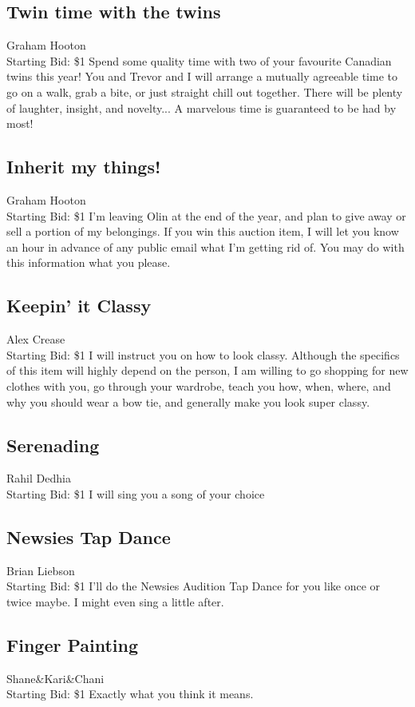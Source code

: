 \documentclass[11pt]{article}
\begin{document}
\subsection{Twin time with the twins}
Graham Hooton
\\
Starting Bid: \$1
\newline
Spend some quality time with two of your favourite Canadian twins this year! You and Trevor and I will arrange a mutually agreeable time to go on a walk, grab a bite, or just straight chill out together. There will be plenty of laughter, insight, and novelty... A marvelous time is guaranteed to be had by most!
\subsection{Inherit my things!}
Graham Hooton
\\
Starting Bid: \$1
\newline
I'm leaving Olin at the end of the year, and plan to give away or sell a portion of my belongings. If you win this auction item, I will let you know an hour in advance of any public email what I'm getting rid of. You may do with this information what you please.
\subsection{Keepin' it Classy}
Alex Crease
\\
Starting Bid: \$1
\newline
I will instruct you on how to look classy. Although the specifics of this item will highly depend on the person, I am willing to go shopping for new clothes with you, go through your wardrobe, teach you how, when, where, and why you should wear a bow tie, and generally make you look super classy.
\subsection{Serenading}
Rahil Dedhia
\\
Starting Bid: \$1
\newline
I will sing you a song of your choice
\subsection{Newsies Tap Dance}
Brian Liebson
\\
Starting Bid: \$1
\newline
I'll do the Newsies Audition Tap Dance for you like once or twice maybe. I might even sing a little after.
\subsection{Finger Painting}
Shane\&Kari\&Chani
\\
Starting Bid: \$1
\newline
Exactly what you think it means.
\end{document}
